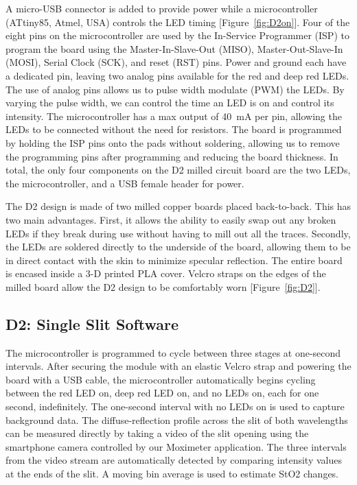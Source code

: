 A micro-USB connector is added to provide power while a microcontroller (ATtiny85, Atmel, USA) controls the LED timing [Figure~\ref{fig:D2on}]. Four of the eight pins on the microcontroller are used by the In-Service Programmer (ISP) to program the board using the Master-In-Slave-Out (MISO), Master-Out-Slave-In (MOSI), Serial Clock (SCK), and reset (RST) pins. Power and ground each have a dedicated pin, leaving two analog pins available for the red and deep red LEDs. The use of analog pins allows us to pulse width modulate (PWM) the LEDs. By varying the pulse width, we can control the time an LED is on and control its intensity. The microcontroller has a max output of 40~mA per pin, allowing the LEDs to be connected without the need for resistors. The board is programmed by holding the ISP pins onto the pads without soldering, allowing us to remove the programming pins after programming and reducing the board thickness. In total, the only four components on the D2 milled circuit board are the two LEDs, the microcontroller, and a USB female header for power. 

The D2 design is made of two milled copper boards placed back-to-back. This has two main advantages. First, it allows the ability to easily swap out any broken LEDs if they break during use without having to mill out all the traces. Secondly, the LEDs are soldered directly to the underside of the board, allowing them to be in direct contact with the skin to minimize specular reflection. The entire board is encased inside a 3-D printed PLA cover. Velcro straps on the edges of the milled board allow the D2 design to be comfortably worn [Figure~\ref{fig:D2}]. 

\subsection{D2: Single Slit Software}
The microcontroller is programmed to cycle between three stages at one-second intervals. After securing the module with an elastic Velcro strap and powering the board with a USB cable, the microcontroller automatically begins cycling between the red LED on, deep red LED on, and no LEDs on, each for one second, indefinitely. The one-second interval with no LEDs on is used to capture background data. The diffuse-reflection profile across the slit of both wavelengths can be measured directly by taking a video of the slit opening using the smartphone camera controlled by our Moximeter application. The three intervals from the video stream are automatically detected by comparing intensity values at the ends of the slit. A moving bin average is used to estimate StO2 changes. 

